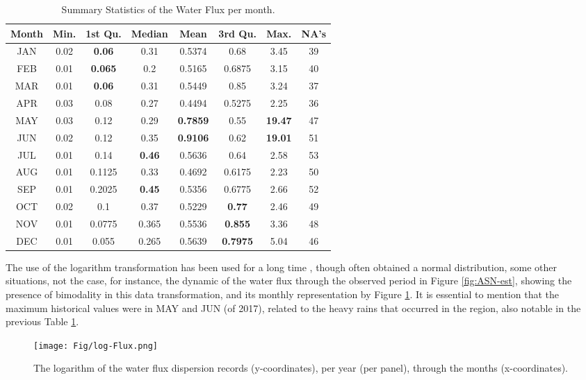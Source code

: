 \documentclass[]{interact}
\theoremstyle{plain}%
\theoremstyle{definition}
\theoremstyle{remark}
\begin{document}
\begin{table}[htbp]
\centering
\caption{Summary Statistics of the Water Flux per month.}
\begin{tabular}{c|c|c|c|c|c|c|c}
\hline
 Month &    Min. &  1st Qu. &   Median &     Mean &  3rd Qu. &     Max. &     NA's \\ \hline
JAN & 0.02 & \textbf{0.06} & 0.31 & 0.5374 & 0.68 & 3.45 & 39 \\ 
FEB & 0.01 & \textbf{0.065} & 0.2 & 0.5165 & 0.6875 & 3.15 & 40 \\ 
MAR & 0.01 & \textbf{0.06} & 0.31 & 0.5449 & 0.85 & 3.24 & 37 \\ 
APR & 0.03 & 0.08 & 0.27 & 0.4494 & 0.5275 & 2.25 & 36 \\ 
MAY & 0.03 & 0.12 & 0.29 & \textbf{0.7859} & 0.55 & \textbf{19.47} & 47 \\ 
JUN & 0.02 & 0.12 & 0.35 & \textbf{0.9106} & 0.62 & \textbf{19.01} & 51 \\ 
JUL & 0.01 & 0.14 & \textbf{0.46} & 0.5636 & 0.64 & 2.58 & 53 \\ 
AUG & 0.01 & 0.1125 & 0.33 & 0.4692 & 0.6175 & 2.23 & 50 \\ 
SEP & 0.01 & 0.2025 & \textbf{0.45} & 0.5356 & 0.6775 & 2.66 & 52 \\ 
OCT & 0.02 & 0.1 & 0.37 & 0.5229 & \textbf{0.77} & 2.46 & 49 \\ 
NOV & 0.01 & 0.0775 & 0.365 & 0.5536 & \textbf{0.855} & 3.36 & 48 \\ 
DEC & 0.01 & 0.055 & 0.265 & 0.5639 & \textbf{0.7975} & 5.04 & 46 \\ \hline
\end{tabular}
\label{tab:summary}
\end{table}

The use of the logarithm transformation has been used for a long time \cite{finney1941distribution}, though often obtained a normal distribution, some other situations, not the case, for instance, the dynamic of the water flux through the observed period in Figure \ref{fig:ASN-est}, showing the presence of bimodality in this data transformation, and its monthly representation by Figure \ref{fig:year}. It is essential to mention that the maximum historical values were in MAY and JUN (of 2017), related to the heavy rains that occurred in the region, also notable in the previous Table \ref{tab:summary}.

\begin{figure}[!ht]
    \centering
    \texttt{[image: Fig/log-Flux.png]}
    \caption{The logarithm of the water flux dispersion records (y-coordinates), per year (per panel), through the months (x-coordinates).}
    \label{fig:year}
\end{figure}
\end{document}
